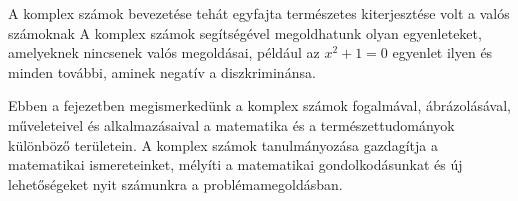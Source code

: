 A komplex számok bevezetése tehát egyfajta természetes kiterjesztése volt a
valós számoknak A komplex számok segítségével megoldhatunk olyan egyenleteket,
amelyeknek nincsenek valós megoldásai, például az $x^2 + 1 = 0$ egyenlet ilyen
és minden további, aminek negatív a diszkriminánsa.

Ebben a fejezetben megismerkedünk a komplex számok fogalmával, ábrázolásával,
műveleteivel és alkalmazásaival a matematika és a természettudományok különböző
területein. A komplex számok tanulmányozása gazdagítja a matematikai
ismereteinket, mélyíti a matematikai gondolkodásunkat és új lehetőségeket nyit
számunkra a problémamegoldásban.

\chaptertoc
\egroup

\clearpage
